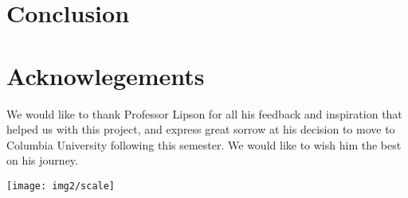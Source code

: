 \documentclass{pnastwo}
\begin{document}
\begin{article}
\section{Conclusion}

\section{Acknowlegements}
We would like to thank Professor Lipson for all his feedback and inspiration that helped us with this project, and express great sorrow at his decision to move to Columbia University following this semester. We would like to wish him the best on his journey.

\begin{figure*}[ht]
\centerline{\texttt{[image: img2/scale]}}
\caption{The individual mel-spectrogram of each of the notes in the middle octave of the piano. \footnote{All of these notes have been reduced to the same length, although they are in actuality of different lengths}}\label{fig6}
\end{figure*}




%



\end{article}
\end{document}
